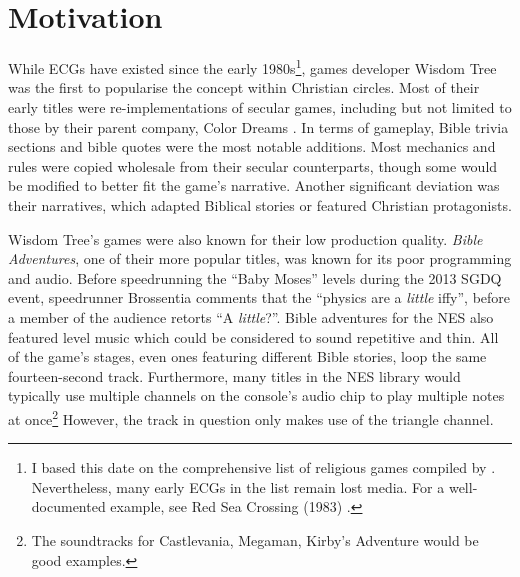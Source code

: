 
\section{Motivation} %

While \acp{ECG} have existed since the early 1980s\footnote{I based this date on the comprehensive list of religious games compiled by \textcite{gonzalez_religious_2022}. Nevertheless, many early \acp{ECG} in the list remain lost media. For a well-documented example, see Red Sea Crossing (1983) \parencite{lucky_chorus_2023, goldfarb_holy_2012}.}, games developer Wisdom Tree was the first to popularise the concept within Christian circles. Most of their early titles were re-implementations of secular games, including but not limited to those by their parent company, Color Dreams \parencite[287]{bogost_persuasive_2007}. In terms of gameplay, Bible trivia sections and bible quotes were the most notable additions. Most mechanics and rules were copied wholesale from their secular counterparts, though some would be modified to better fit the game's narrative. Another significant deviation was their narratives, which adapted Biblical stories or featured Christian protagonists. 

Wisdom Tree's games were also known for their low production quality. \textit{Bible Adventures}, one of their more popular titles, was known for its poor programming and audio. Before speedrunning the ``Baby Moses'' levels during the 2013 \ac{SGDQ} event, speedrunner Brossentia comments that the ``physics are a \textit{little} iffy'', before a member of the audience retorts ``A \textit{little}?''. Bible adventures for the \ac{NES} also featured level music which could be considered to sound repetitive and thin. All of the game's stages, even ones featuring different Bible stories, loop the same fourteen-second track. Furthermore, many titles in the \ac{NES} library would typically use multiple channels on the console's audio chip to play multiple notes at once\footnote{The soundtracks for Castlevania, Megaman, Kirby's Adventure would be good examples.} However, the track in question only makes use of the triangle channel.


